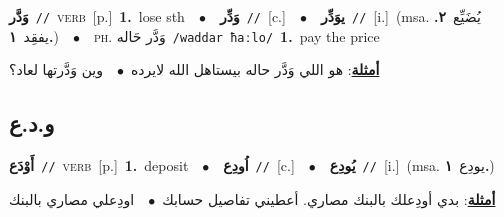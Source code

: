 \documentclass[10pt,a4paper,twoside]{article} %
\begin{document}
\begin{multicols}{2}
{\setlength\topsep{0pt}\textbf{\foreignlanguage{arabic}{وَدَّر}}\ {\color{gray}\texttt{//}\color{black}}\ \textsc{verb}\ [p.]\ \textbf{1.}~lose sth\ \ $\bullet$\ \ \setlength\topsep{0pt}\textbf{\foreignlanguage{arabic}{وَدِّر}}\ {\color{gray}\texttt{//}\color{black}}\ [c.]\ \ $\bullet$\ \ \setlength\topsep{0pt}\textbf{\foreignlanguage{arabic}{يوَدِّر}}\ {\color{gray}\texttt{//}\color{black}}\ [i.]\ \color{gray}(msa. \foreignlanguage{arabic}{يُضَيِّع}~\foreignlanguage{arabic}{\textbf{٢.}}  \foreignlanguage{arabic}{يفقِد}~\foreignlanguage{arabic}{\textbf{١.}})\color{black}\ \ $\bullet$\ \ \textsc{ph.} \color{gray} \foreignlanguage{arabic}{وَدَّر حَاله}\color{black}\ {\color{gray}\texttt{/{\sffamily waddar ħaːlo}/}\color{black}}\ \textbf{1.}~pay the price\  \begin{flushright}\color{gray}\foreignlanguage{arabic}{\textbf{\underline{\foreignlanguage{arabic}{أمثلة}}}: هو اللي وَدَّر حاله بيستاهل الله لايرده\ $\bullet$\ \  وين وَدَّرتها لعاد؟}\end{flushright}\color{black}} \vspace{2mm}

\vspace{-3mm}
\subsection*{\color{blue}\foreignlanguage{arabic}{و.د.ع}\color{blue}{}} 

{\setlength\topsep{0pt}\textbf{\foreignlanguage{arabic}{أَوْدَع}}\ {\color{gray}\texttt{//}\color{black}}\ \textsc{verb}\ [p.]\ \textbf{1.}~deposit\ \ $\bullet$\ \ \setlength\topsep{0pt}\textbf{\foreignlanguage{arabic}{اُودِع}}\ {\color{gray}\texttt{//}\color{black}}\ [c.]\ \ $\bullet$\ \ \setlength\topsep{0pt}\textbf{\foreignlanguage{arabic}{يُودِع}}\ {\color{gray}\texttt{//}\color{black}}\ [i.]\ \color{gray}(msa. \foreignlanguage{arabic}{يودِع}~\foreignlanguage{arabic}{\textbf{١.}})\color{black}\  \begin{flushright}\color{gray}\foreignlanguage{arabic}{\textbf{\underline{\foreignlanguage{arabic}{أمثلة}}}: بدي أودِعلك بالبنك مصاري. أعطيني تفاصيل حسابك\ $\bullet$\ \  اودِعلي مصاري بالبنك}\end{flushright}\color{black}} \vspace{2mm}


\end{multicols}
\end{document}

